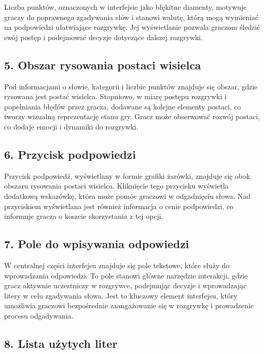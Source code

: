 \documentclass[]{report}
\begin{document}
Liczba punktów, oznaczonych w interfejsie jako błękitne diamenty, motywuje graczy do poprawnego zgadywania słów i stanowi walutę, którą mogą wymieniać na podpowiedzi ułatwiające rozgrywkę. Jej wyświetlanie pozwala graczom śledzić swój postęp i podejmować decyzje dotyczące dalszej rozgrywki.

\subsection*{5. Obszar rysowania postaci wisielca}

Pod informacjami o słowie, kategorii i liczbie punktów znajduje się obszar, gdzie rysowana jest postać wisielca. Stopniowo, w miarę postępu rozgrywki i popełniania błędów przez gracza, dodawane są kolejne elementy postaci, co tworzy wizualną reprezentację stanu gry. Gracz może obserwować rozwój postaci, co dodaje emocji i dynamiki do rozgrywki.

\subsection*{6. Przycisk podpowiedzi}

Przycisk podpowiedź, wyświetlany w formie grafiki żarówki, znajduje się obok obszaru rysowania postaci wisielca. Kliknięcie tego przycisku wyświetla dodatkową wskazówkę, która może pomóc graczowi w odgadnięciu słowa. Nad przyciskiem wyświetlana jest również informacja o cenie podpowiedzi, co informuje gracza o koszcie skorzystania z tej opcji.

\subsection*{7. Pole do wpisywania odpowiedzi}

W centralnej części interfejsu znajduje się pole tekstowe, które służy do wprowadzania odpowiedzi. To pole stanowi główne narzędzie interakcji, gdzie gracz aktywnie uczestniczy w rozgrywce, podejmując decyzje i wprowadzając litery w celu zgadywania słowa. Jest to kluczowy element interfejsu, który umożliwia graczowi bezpośrednie zaangażowanie się w rozgrywkę i prowadzenie procesu odgadywania.

\subsection*{8. Lista użytych liter}
\end{document}
